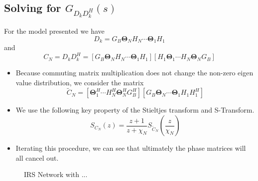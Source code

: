 \documentclass[12pt,a4paper]{report}
\begin{document}
\subsection{Solving for $G_{D_kD_k^H}(s)$ } 
For the model presented we have 
\begin{equation}
D_k = G_B \boldsymbol{\Theta}_N H_N \cdots \boldsymbol{\Theta}_1 H_1
\end{equation}
and 
\begin{equation}
C_N = D_kD_k^H = [G_B \boldsymbol{\Theta}_N H_N \cdots \boldsymbol{\Theta}_1 H_1]
[H_1 \boldsymbol{\Theta}_1 \cdots H_N \boldsymbol{\Theta}_N G_B]
\end{equation}
\begin{itemize}
\item 
	Because commuting matrix multiplication does not change the non-zero eigen value distribution, we consider 
	the matrix 
\begin{equation}
\tilde{C}_N = [\boldsymbol{\Theta}_1^H \cdots H_N^H \boldsymbol{\Theta}_N^H G_B^H][G_B \boldsymbol{\Theta}_N  \cdots \boldsymbol{\Theta}_1 H_1 H_1^H]
\end{equation}

\item 
	We use the following key property of the Stieltjes transform and S-Transform. 
\begin{equation}
S_{C_N}(z) = \frac{z+1}{z+\chi_N} S_{\tilde{C}_N}(\frac{z}{\chi_N})
\end{equation}

\item 
	Iterating this procedure, we can see that ultimately the phase matrices will all cancel out.

\end{itemize}



\begin{figure}

\caption{IRS Network with ...}
\label{irs_figure}
\end{figure}
\end{document}
